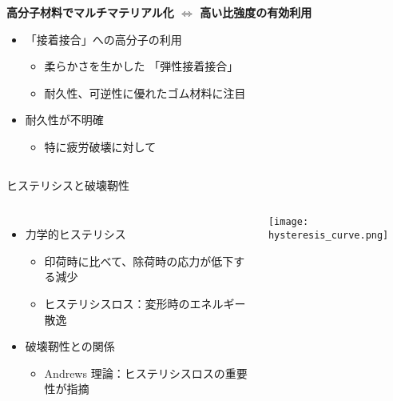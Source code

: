 \begin{columns}[totalwidth=.9\linewidth]
    \column{\textwidth}
        \begin{boxnote}
            \textbf{高分子材料でマルチマテリアル化 $\Leftrightarrow$ 高い比強度の有効利用}
            \begin{itemize}
                \item {\color{red} 「接着接合」}への高分子の利用
                    \begin{itemize}
                        \item 柔らかさを生かした{\color{red} 「弾性接着接合」}
                        \item 耐久性、可逆性に優れた\alert{ゴム材料に注目}
                    \end{itemize}
                \item {\color{blue}耐久性が不明確}
                    \begin{itemize}
                        \item 特に疲労破壊に対して
                    \end{itemize}
            \end{itemize}
        \end{boxnote}
\end{columns}

\begin{columns}[totalwidth=.9\linewidth]
    \column{\textwidth}
    \begin{itembox}[l]{ヒステリシスと破壊靭性}
        \begin{columns}[totalwidth=\linewidth]
                \begin{itemize}
                    \item 力学的ヒステリシス
                    \begin{itemize}
                        \item
                        印荷時に比べて、除荷時の応力が低下する減少
                        \item
                        ヒステリシスロス：変形時のエネルギー散逸
                    \end{itemize}
                    \item 破壊靭性との関係
                    \begin{itemize}
                        \item
                        Andrews 理論：ヒステリシスロスの重要性が指摘
                    \end{itemize}
                \end{itemize}
                \centering
                \texttt{[image: hysteresis\_curve.png]}
            \end{columns}
    \end{itembox}
\end{columns}

